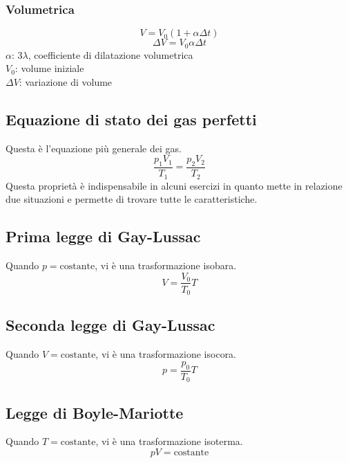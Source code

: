 \subsubsection{Volumetrica}
\begin{equation*}
  V = V_0\left(1+\alpha\Delta t\right)
\end{equation*}
\begin{equation*}
  \Delta V = V_0\alpha\Delta t
\end{equation*}
$\alpha$: $3\lambda$, coefficiente di dilatazione volumetrica\\
$V_0$: volume iniziale\\
$\Delta V$: variazione di volume

\subsection{Equazione di stato dei gas perfetti}
Questa è l'equazione più generale dei gas.
\begin{equation*}
  \frac{p_1V_1}{T_1} = \frac{p_2V_2}{T_2}
\end{equation*}
Questa proprietà è indispensabile in alcuni esercizi in quanto mette in relazione due situazioni e
permette di trovare tutte le caratteristiche.


\subsection{Prima legge di Gay-Lussac}
Quando $p = \text{costante}$, vi è una trasformazione isobara.
\begin{equation*}
  V = \frac{V_0}{T_0}T
\end{equation*}

\subsection{Seconda legge di Gay-Lussac}
Quando $V = \text{costante}$, vi è una trasformazione isocora.
\begin{equation*}
  p = \frac{p_0}{T_0}T
\end{equation*}

\subsection{Legge di Boyle-Mariotte}
Quando $T = \text{costante}$, vi è una trasformazione isoterma.
\begin{equation*}
  pV = \text{costante}
\end{equation*}


